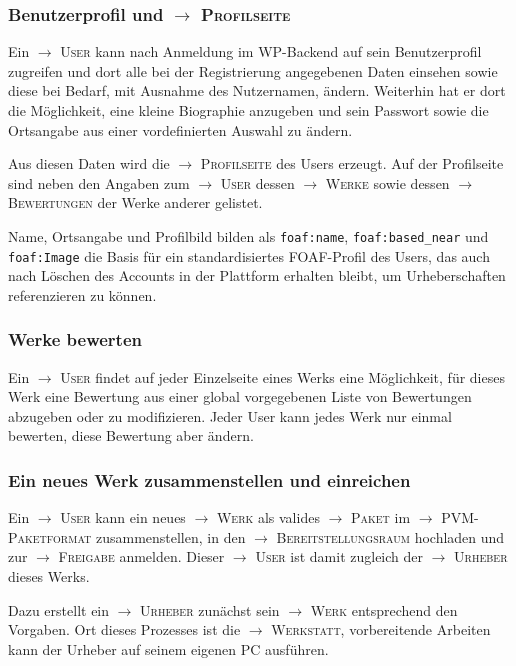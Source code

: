 \documentclass[a4paper,11pt]{article}
\newcommand{\glossar}[1]{{$\to$ \textsc{#1}}}
\begin{document}
\subsubsection{Benutzerprofil und \glossar{Profilseite}}

Ein \glossar{User} kann nach Anmeldung im WP-Backend auf sein Benutzerprofil
zugreifen und dort alle bei der Registrierung angegebenen Daten einsehen sowie
diese bei Bedarf, mit Ausnahme des Nutzernamen, ändern.  Weiterhin hat er dort
die Möglichkeit, eine kleine Biographie anzugeben und sein Passwort sowie die
Ortsangabe aus einer vordefinierten Auswahl zu ändern. 

Aus diesen Daten wird die \glossar{Profilseite} des Users erzeugt.  Auf der
Profilseite sind neben den Angaben zum \glossar{User} dessen \glossar{Werke}
sowie dessen \glossar{Bewertungen} der Werke anderer gelistet.

Name, Ortsangabe und Profilbild bilden als \texttt{foaf:name},
\texttt{foaf:based\_near} und \texttt{foaf:Image} die Basis für ein
standardisiertes FOAF-Profil des Users, das auch nach Löschen des Accounts in
der Plattform erhalten bleibt, um Urheberschaften referenzieren zu können.

\subsubsection{Werke bewerten}

Ein \glossar{User} findet auf jeder Einzelseite eines Werks eine Möglichkeit,
für dieses Werk eine Bewertung aus einer global vorgegebenen Liste von
Bewertungen abzugeben oder zu modifizieren. Jeder User kann jedes Werk nur
einmal bewerten, diese Bewertung aber ändern. 

\subsubsection{Ein neues Werk zusammenstellen und einreichen}

Ein \glossar{User} kann ein neues \glossar{Werk} als valides \glossar{Paket} im
\glossar{PVM-Paketformat} zusammenstellen, in den \glossar{Bereitstellungsraum}
hochladen und zur \glossar{Freigabe} anmelden.  Dieser \glossar{User} ist damit
zugleich der \glossar{Urheber} dieses Werks.

Dazu erstellt ein \glossar{Urheber} zunächst sein \glossar{Werk} entsprechend
den Vorgaben.  Ort dieses Prozesses ist die \glossar{Werkstatt}, vorbereitende
Arbeiten kann der Urheber auf seinem eigenen PC ausführen.  
\end{document}
